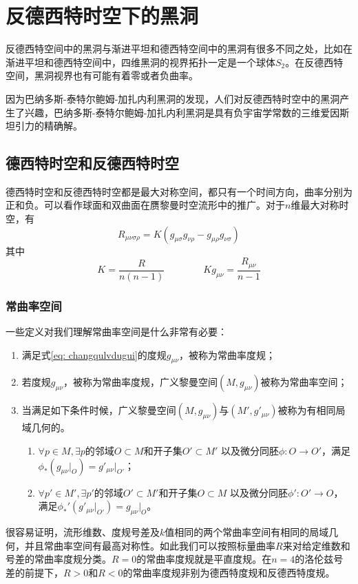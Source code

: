 \chapter{反德西特时空下的黑洞}
反德西特空间中的黑洞与渐进平坦和德西特空间中的黑洞有很多不同之处，比如在渐进平坦和德西特空间中，四维黑洞的视界拓扑一定是一个球体$S_2$\citep{friedman1993topological}。在反德西特空间，黑洞视界也有可能有着零或者负曲率\citep{cai2004thermodynamics}。

因为巴纳多斯-泰特尔鲍姆-加扎内利黑洞\citep{banados1992black}的发现，人们对反德西特时空中的黑洞产生了兴趣，巴纳多斯-泰特尔鲍姆-加扎内利黑洞是具有负宇宙学常数的三维爱因斯坦引力的精确解\citep{cai1999topological}。

\section{德西特时空和反德西特时空}
德西特时空和反德西特时空都是最大对称空间，都只有一个时间方向，曲率分别为正和负。可以看作球面和双曲面在赝黎曼时空流形中的推广\citep{陈斌2018广义相对论}。对于$n$维最大对称时空，有
\begin{equation}\label{eq: changqulvdugui}
    R_{\mu \nu \sigma \rho}=K\left(g_{\mu \sigma}g_{\nu \rho}-g_{\mu \rho}g_{\nu \sigma}\right)
\end{equation}
其中
\begin{equation}
    K=\frac{R}{n \left(n-1\right)} \qquad \qquad K g_{\mu \nu}=\frac{R_{\mu \nu}}{n-1}
\end{equation}
\subsection{常曲率空间}
一些定义对我们理解常曲率空间是什么非常有必要\citep{梁灿彬2006微分几何入门与广义相对论}：
\begin{enumerate}
    \item 满足式\eqref{eq: changqulvdugui}的度规$g_{\mu \nu}$，被称为常曲率度规；
    \item 若度规$g_{\mu \nu}$，被称为常曲率度规，广义黎曼空间$\left(M,g_{\mu \nu}\right)$被称为常曲率空间；
    \item 当满足如下条件时候，广义黎曼空间$\left(M,g_{\mu \nu}\right)$与$\left(M',g'_{\mu \nu}\right)$被称为有相同局域几何的。
    \begin{enumerate}
        \item $\forall p \in M, \exists p$的邻域$O\subset M$和开子集$O'\subset M'$ 以及微分同胚$\phi: O\rightarrow O'$，满足$\phi_* \left(g_{\mu \nu} |  _O\right)=g'_{\mu \nu}| _{O'}$；
        \item $\forall p' \in M', \exists p'$的邻域$O'\subset M'$和开子集$O\subset M$ 以及微分同胚$\phi': O'\rightarrow O$，满足$\phi_*' \left(g'_{\mu \nu} |_{O'}\right)=g_{\mu \nu}| _O$。
    \end{enumerate}
\end{enumerate}
很容易证明，流形维数、度规号差及$k$值相同的两个常曲率空间有相同的局域几何，并且常曲率空间有最高对称性\citep{梁灿彬2006微分几何入门与广义相对论}。如此我们可以按照标量曲率$R$来对给定维数和号差的常曲率度规分类。$R=0$的常曲率度规就是平直度规。在$n=4$的洛伦兹号差的前提下，$R>0$和$R<0$的常曲率度规非别为德西特度规和反德西特度规。
